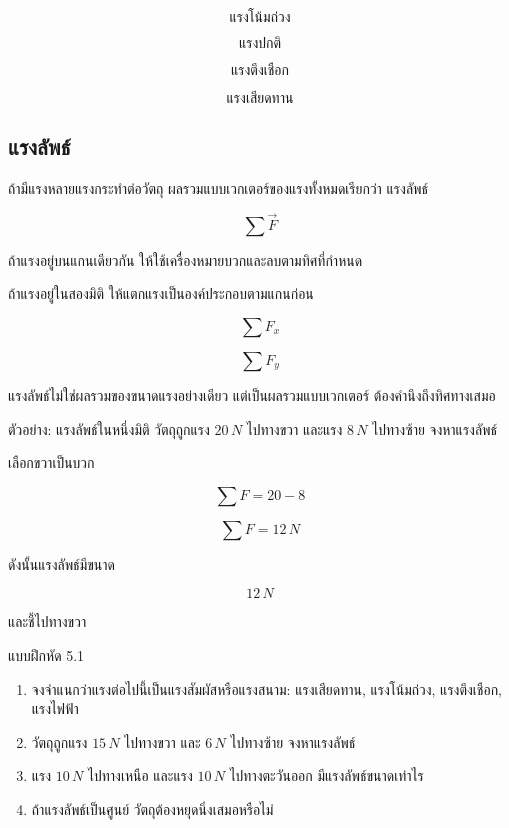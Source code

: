 \[
\text{แรงโน้มถ่วง}
\]

\[
\text{แรงปกติ}
\]

\[
\text{แรงตึงเชือก}
\]

\[
\text{แรงเสียดทาน}
\]

\subsection{แรงลัพธ์}

ถ้ามีแรงหลายแรงกระทำต่อวัตถุ ผลรวมแบบเวกเตอร์ของแรงทั้งหมดเรียกว่า แรงลัพธ์

\[
\sum \vec{F}
\]

ถ้าแรงอยู่บนแกนเดียวกัน ให้ใช้เครื่องหมายบวกและลบตามทิศที่กำหนด

ถ้าแรงอยู่ในสองมิติ ให้แตกแรงเป็นองค์ประกอบตามแกนก่อน

\[
\sum F_x
\]

\[
\sum F_y
\]

\begin{tcolorbox}[title=ข้อควรจำ]
แรงลัพธ์ไม่ใช่ผลรวมของขนาดแรงอย่างเดียว แต่เป็นผลรวมแบบเวกเตอร์ ต้องคำนึงถึงทิศทางเสมอ
\end{tcolorbox}

\begin{examplebox}{ตัวอย่าง: แรงลัพธ์ในหนึ่งมิติ}
วัตถุถูกแรง $20\,\si{N}$ ไปทางขวา และแรง $8\,\si{N}$ ไปทางซ้าย จงหาแรงลัพธ์

เลือกขวาเป็นบวก

\[
\sum F=20-8
\]

\[
\sum F=12\,\si{N}
\]

ดังนั้นแรงลัพธ์มีขนาด

\[
12\,\si{N}
\]

และชี้ไปทางขวา
\end{examplebox}

\begin{exercisebox}{แบบฝึกหัด 5.1}
\begin{enumerate}
    \item จงจำแนกว่าแรงต่อไปนี้เป็นแรงสัมผัสหรือแรงสนาม: แรงเสียดทาน, แรงโน้มถ่วง, แรงตึงเชือก, แรงไฟฟ้า
    \item วัตถุถูกแรง $15\,\si{N}$ ไปทางขวา และ $6\,\si{N}$ ไปทางซ้าย จงหาแรงลัพธ์
    \item แรง $10\,\si{N}$ ไปทางเหนือ และแรง $10\,\si{N}$ ไปทางตะวันออก มีแรงลัพธ์ขนาดเท่าไร
    \item ถ้าแรงลัพธ์เป็นศูนย์ วัตถุต้องหยุดนิ่งเสมอหรือไม่
\end{enumerate}
\end{exercisebox}

